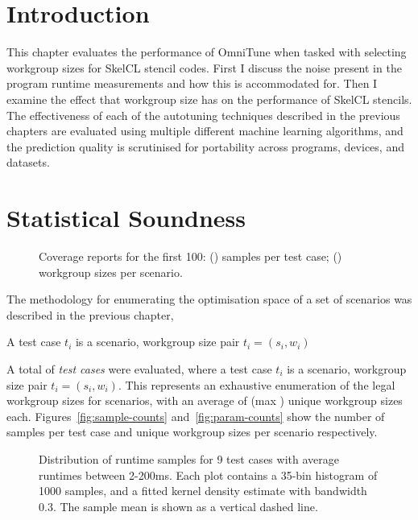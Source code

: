 \section{Introduction}

This chapter evaluates the performance of OmniTune when tasked with
selecting workgroup sizes for SkelCL stencil codes. First I discuss
the noise present in the program runtime measurements and how this is
accommodated for. Then I examine the effect that workgroup size has on
the performance of SkelCL stencils. The effectiveness of each of the
autotuning techniques described in the previous chapters are evaluated
using multiple different machine learning algorithms, and the
prediction quality is scrutinised for portability across programs,
devices, and datasets.


\section{Statistical Soundness}


\begin{figure}
  
  \caption{%
    Coverage reports for the first 100: ()
    samples per test case; () workgroup sizes
    per scenario.%
  }
\label{fig:num-samples}
\end{figure}

The methodology for enumerating the optimisation space of a set of
scenarios was described in the previous chapter,

A test case $t_i$ is a scenario, workgroup size pair $t_i = (s_i,w_i)$

A total of  \emph{test cases} were
evaluated, where a test case $t_i$ is a scenario, workgroup size pair
$t_i = (s_i,w_i)$. This represents an exhaustive enumeration of the
legal workgroup sizes for  scenarios, with an
average of  (max )
unique workgroup sizes each. Figures~\ref{fig:sample-counts}
and~\ref{fig:param-counts} show the number of samples per test case
and unique workgroup sizes per scenario respectively.


\begin{figure}

\caption{%
  Distribution of runtime samples for 9 test cases with average
  runtimes between 2-200ms. Each plot contains a 35-bin histogram of
  1000 samples, and a fitted kernel density estimate with bandwidth
  0.3. The sample mean is shown as a vertical dashed line.%
}
\label{fig:runtime-histograms}
\end{figure}


